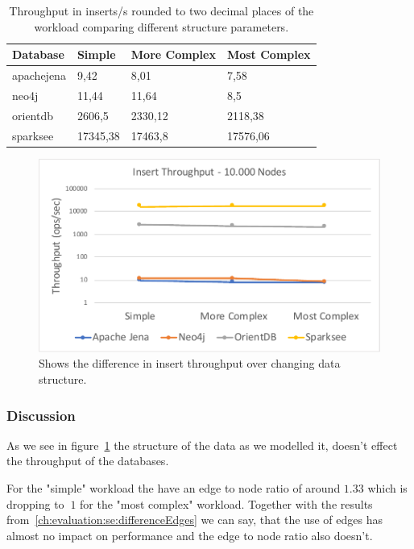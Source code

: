 \begin{table}[h!]
  \begin{minipage}{\textwidth}
    \centering
    \begin{tabularx}{\textwidth}{ | l | X | X | X | }
      \hline
      Database & Simple & More Complex & Most Complex \\ \hline
      apachejena & 9,42 & 8,01 & 7,58 \\ \hline
      neo4j & 11,44 & 11,64 & 8,5 \\ \hline
      orientdb & 2606,5 & 2330,12 & 2118,38 \\ \hline
      sparksee & 17345,38 & 17463,8 & 17576,06 \\ \hline
    \end{tabularx}
  \end{minipage}
  \caption{Throughput in inserts/s rounded to two decimal places of the workload comparing different structure parameters.}
  \label{tab:structure}
\end{table}

\begin{figure}[h!]
  \centering
  \includegraphics[width=.75\textwidth]{images/production/structure}
  \caption{Shows the difference in insert throughput over changing data structure.}
  \label{fig:structure}
\end{figure}

\subsubsection{Discussion}
As we see in figure~\ref{fig:structure} the structure of the data as we modelled it,
doesn't effect the throughput of the databases.

For the "simple" workload the have an edge to node ratio of around $ 1.33 $ which is dropping to $ ~1 $ for the "most complex" workload.
Together with the results from~\ref{ch:evaluation:se:differenceEdges} we can say,
that the use of edges has almost no impact on performance and the edge to node ratio also doesn't.

